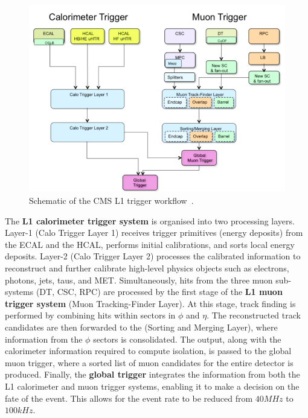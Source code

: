 \begin{figure}[h]
\centering
\includegraphics[width= 1.0\textwidth]{Figures/Chapter3/CMS_L1_Trigger.png}
\caption{Schematic of the CMS L1 trigger workflow~\cite{CMS_L1_Trigger}.}
\label{Figure:Chapter3_CMS_L1_Trigger}
\end{figure}

The \textbf{L1 calorimeter trigger system} is organised into two processing layers. Layer-1 (Calo Trigger Layer 1) receives trigger primitives (energy deposits) from the ECAL and the HCAL, performs initial calibrations, and sorts local energy deposits. Layer-2 (Calo Trigger Layer 2) processes the calibrated information to reconstruct and further calibrate high-level physics objects such as electrons, photons, jets, taus, and MET. Simultaneously, hits from the three muon sub-systems (DT, CSC, RPC) are processed by the first stage of the \textbf{L1 muon trigger system} (Muon Tracking-Finder Layer). At this stage, track finding is performed by combining hits within sectors in $\phi$ and $\eta$. The reconstructed track candidates are then forwarded to the (Sorting and Merging Layer), where information from the $\phi$ sectors is consolidated. The output, along with the calorimeter information required to compute isolation, is passed to the global muon trigger, where a sorted list of muon candidates for the entire detector is produced. Finally, the \textbf{global trigger} integrates the information from both the L1 calorimeter and muon trigger systems, enabling it to make a decision on the fate of the event. This allows for the event rate to be reduced from $40\unit{MHz}$ to $100\unit{kHz}$.

